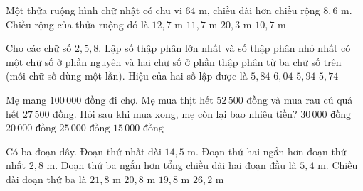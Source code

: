\begin{ex} %
Một thửa ruộng hình chữ nhật có chu vi $64\text{ m}$, chiều dài hơn chiều rộng $8{,}6\text{ m}$. Chiều rộng của thửa ruộng đó là
\choice
{$12{,}7\text{ m}$}
{\True $11{,}7\text{ m}$}
{$20{,}3\text{ m}$}
{$10{,}7\text{ m}$}
\end{ex}

\begin{ex} %
Cho các chữ số $2, 5, 8$. Lập số thập phân lớn nhất và số thập phân nhỏ nhất có một chữ số ở phần nguyên và hai chữ số ở phần thập phân từ ba chữ số trên (mỗi chữ số dùng một lần). Hiệu của hai số lập được là
\choice
{$5{,}84$}
{$6{,}04$}
{\True $5{,}94$}
{$5{,}74$}
\end{ex}

\begin{ex} %
Mẹ mang $100\,000$ đồng đi chợ. Mẹ mua thịt hết $52\,500$ đồng và mua rau củ quả hết $27\,500$ đồng. Hỏi sau khi mua xong, mẹ còn lại bao nhiêu tiền?
\choice
{$30\,000\text{ đồng}$}
{\True $20\,000\text{ đồng}$}
{$25\,000\text{ đồng}$}
{$15\,000\text{ đồng}$}
\end{ex}

\begin{ex} %
Có ba đoạn dây. Đoạn thứ nhất dài $14{,}5\text{ m}$. Đoạn thứ hai ngắn hơn đoạn thứ nhất $2{,}8\text{ m}$. Đoạn thứ ba ngắn hơn tổng chiều dài hai đoạn đầu là $5{,}4\text{ m}$. Chiều dài đoạn thứ ba là
\choice
{$21{,}8\text{ m}$}
{\True $20{,}8\text{ m}$}
{$19{,}8\text{ m}$}
{$26{,}2\text{ m}$}
\end{ex}

